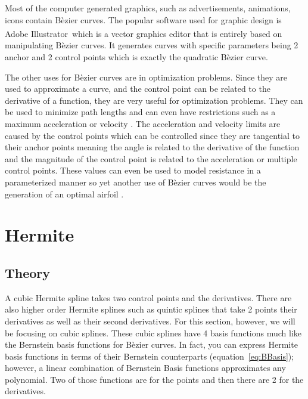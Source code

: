 \documentclass[12pt, letterpaper]{article}
\begin{document}
Most of the computer generated graphics, such as advertisements, animations, icons contain B\`ezier curves.
The popular software used for graphic design is Adobe Illustrator\textsuperscript\textregistered \, which is 
a vector graphics editor that is entirely based on manipulating B\`ezier curves.
It generates curves with specific parameters being 2 anchor and 2 control points which is exactly the
quadratic B\`ezier curve. 

The other uses for B\`ezier curves are in optimization problems. Since they are used to approximate a 
curve, and the control point can be related to the derivative of a function, they are very useful for
optimization problems. They can be used to minimize path lengths \citep{bezierPaths} and can even have
restrictions such as a maximum acceleration or velocity \citep{bezierSoccerPaths}. The acceleration and
velocity limits are caused by the control points which can be controlled since they are tangential to
their anchor points meaning the angle is related to the derivative of the function and the magnitude of
the control point is related to the acceleration or multiple control points. These values can even be 
used to model resistance in a parameterized manner so yet another use of B\`ezier curves would be the
generation of an optimal airfoil \citep{bezierAirfoil}.

\section{Hermite}

\subsection{Theory}


A cubic Hermite spline takes two control points and the derivatives. There are also higher order Hermite
splines such as quintic splines that take 2 points their derivatives as well as their second derivatives. For
this section, however, we will be focusing on cubic splines. These cubic splines have 4 basis functions much
like the Bernstein basis functions for B\`ezier curves. In fact, you can express Hermite basis functions in
terms of their Bernstein counterparts (equation~\ref{eq:BBasis}); however, a linear combination of Bernstein
Basis functions approximates any polynomial. Two of those functions are for the points and then there are 2 
for the derivatives.
\end{document}
